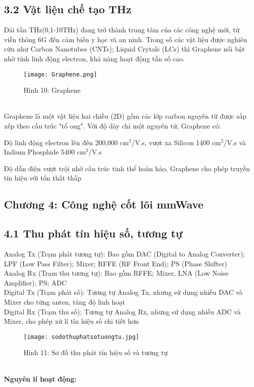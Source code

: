 \documentclass[a4paper,13pt]{article}
\begin{document}
\subsection{3.2 Vật liệu chế tạo THz}
Dải tần THz(0,1-10THz) đang trở thành trung tâm của các công nghệ mới, từ viễn thông 6G đến cảm biến y học và an ninh. Trong số các vật liệu được nghiên cứu như Carbon Nanotubes (CNTs); Liquid Crytals (LCs) thì Graphene nổi bật nhờ tính linh động electron, khả năng hoạt động tần số cao. 
\begin{figure}[htbp]
    \centering
    \texttt{[image: Graphene.png]}
    \caption*{Hình 10: Graphene \cite{key4} }
    \label{fig:model}
\end{figure} \\
Graphene là một vật liệu hai chiều (2D) gồm các lớp carbon nguyên tử được sắp xếp theo cấu trúc "tổ ong". Với độ dày chỉ một nguyên tử, Graphene có:

 \item Độ linh động electron lên đến 200,000 \( \text{cm}^2 \)/V.s, vượt xa Silicon 1400  \( \text{cm}^2 \)/V.s và Indium Phosphide 5400 \( \text{cm}^2 \)/V.s

 \item Độ dẫn điện vượt trội nhờ cấu trúc tinh thể hoàn hảo, Graphene cho phép truyền tín hiệu với tổn thất thấp

\begin{center}
    \section{Chương 4: Công nghệ cốt lõi mmWave}
\end{center}
\subsection{4.1 Thu phát tín hiệu số, tương tự}
Analog Tx (Trạm phát tương tự): Bao gồm DAC (Digital to Analog Converter); LPF (Low Pass Filter); Mixer; RFFE (RF Front End); PS (Phase Shifter) \\ 

Analog Rx (Trạm thu tương tự): Bao gồm RFFE; Mixer, LNA (Low Noise Amplifier); PS; ADC \\

Digital Tx (Trạm phát số): Tương tự Analog Tx, nhưng sử dụng nhiều DAC và Mixer cho từng anten, tăng độ linh hoạt \\

Digital Rx (Trạm thu số): Tương tự Analog Rx, nhưng sử dụng nhiều ADC và Mixer, cho phép xử lí tín hiệu số chi tiết hơn
\begin{figure}[htbp]
    \centering
    \texttt{[image: sodothuphatsotuongtu.jpg]}
    \caption*{Hình 11: Sơ đồ thu phát tín hiệu số và tương tự  \cite{key8} }
    \label{fig:model}
\end{figure} \\
\textbf{Nguyên lí hoạt động:} \\
\end{document}
